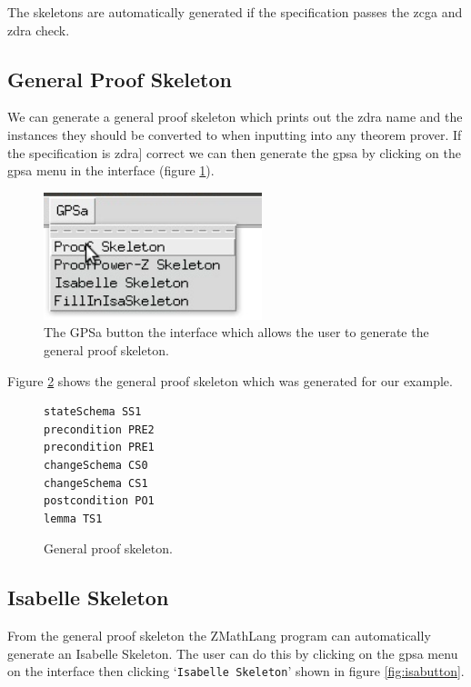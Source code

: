 The skeletons are automatically generated if the specification passes the \gls{zcga} and \gls{zdra} check.

\subsection{General Proof Skeleton}

We can generate a general proof skeleton which prints out the \gls{zdra} name and the instances they should be converted to when inputting into any theorem prover. If the specification is \gls{zdra}] correct we can then generate the \gls{gpsa} by clicking on the \gls{gpsa} menu in the interface (figure \ref{fig:gpsabutton}).

\begin{figure}[H]
\centering
\includegraphics[scale=0.45]{Figures/fullexample/gpsa.png}
\caption{The GPSa button the interface which allows the user to generate the general proof skeleton. \label{fig:gpsabutton}}
\end{figure}

Figure \ref{fig:gpsaFullexample} shows the general proof skeleton which was generated for our example.

\begin{figure}[H]
\centering
\begin{scriptsize}
\begin{BVerbatim}
stateSchema SS1 
precondition PRE2 
precondition PRE1 
changeSchema CS0 
changeSchema CS1 
postcondition PO1 
lemma TS1 
\end{BVerbatim}
\end{scriptsize}
\caption{General proof skeleton. \label{fig:gpsaFullexample}}
\end{figure}

\subsection{Isabelle Skeleton}

From the general proof skeleton the ZMathLang program can automatically generate an Isabelle Skeleton. The user can do this by clicking on the \gls{gpsa} menu on the interface then clicking `\texttt{Isabelle Skeleton}' shown in figure \ref{fig:isabutton}.

